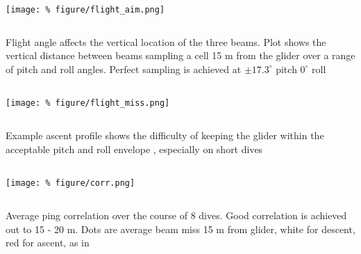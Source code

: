 \documentclass[unknownkeysallowed,usepdftitle=false]{beamer}
\begin{document}
\begin{frame}\label{flight_envelope}
\vspace{-0.3cm}
\begin{center}
\texttt{[image: \%
figure/flight\_aim.png]}
\end{center}
\vspace{-0.3cm}
\begin{columns}
\begin{column}[t]{0.9\textwidth}
Flight angle affects the vertical location of the three beams. Plot shows the vertical distance between beams sampling a cell 15 m from the glider over a range of pitch and roll angles. Perfect sampling is achieved at $\pm17.3^{\circ}$ pitch $0^{\circ}$ roll \hyperlink{dive_flight}{}
\end{column}
\end{columns}
\end{frame}

\begin{frame}\label{dive_flight}
\vspace{-0.3cm}
\begin{center}
\texttt{[image: \%
figure/flight\_miss.png]}
\end{center}
\vspace{-0.3cm}
\begin{columns}
\begin{column}[t]{0.9\textwidth}
Example ascent profile shows the difficulty of keeping the glider within the acceptable pitch and roll envelope \hyperlink{flight_envelope}{}, especially on short dives 
\end{column}
\end{columns}
\end{frame}


\begin{frame}\label{ping_corr}
\vspace{-0.3cm}
\begin{center}
\texttt{[image: \%
figure/corr.png]}
\end{center}
\vspace{-0.3cm}
\begin{columns}
\begin{column}[t]{0.9\textwidth}
Average ping correlation over the course of 8 dives. Good correlation is achieved out to 15 - 20 m. Dots are average beam miss 15 m from glider, white for descent, red for ascent, as in \hyperlink{flight_envelope}{}
\end{column}
\end{columns}
\end{frame}
\end{document}
